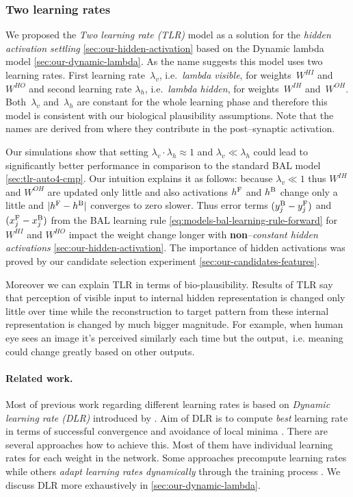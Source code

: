 
\subsubsection{Two learning rates} 
\label{sec:our-tlr}

We proposed the \emph{Two learning rate (TLR)} model as a solution for the \emph{hidden activation settling} \ref{sec:our-hidden-activation} based on the Dynamic lambda model \ref{sec:our-dynamic-lambda}. As the name suggests this model uses two learning rates. First learning rate~$\lambda_v$, i.e.~\emph{lambda visible}, for weights~$W^{HI}$ and~$W^{HO}$ and second learning rate $\lambda_h$, i.e.~\emph{lambda hidden}, for weights~$W^{IH}$ and~$W^{OH}$. Both~$\lambda_v$ and~$\lambda_h$ are constant for the whole learning phase and therefore this model is consistent with our biological plausibility assumptions. Note that the names are derived from where they contribute in the post--synaptic activation. 

Our simulations show that setting $\lambda_v \cdot \lambda_h \approx 1$ and $\lambda_v \ll \lambda_h$ could lead to significantly better performance in comparison to the standard BAL model \ref{sec:tlr-auto4-cmp}. Our intuition explains it as follows: because $\lambda_v \ll 1$ thus $W^{IH}$ and $W^{OH}$ are updated only little and also activations $h^{\rm F}$ and $h^{\rm B}$ change only a little and $|h^{\rm F}- h^{\rm B}|$ converges to zero slower. Thus error terms $(y_j^{\rm B} - y_j^{\rm F})$ and $(x_j^{\rm F} - x_j^{\rm B})$ from the BAL learning rule \ref{eq:models-bal-learning-rule-forward} for $W^{HI}$ and $W^{HO}$ impact the weight change longer with {\bf non}--\emph{constant hidden activations} \ref{sec:our-hidden-activation}. The importance of hidden activations was proved by our candidate selection experiment \ref{sec:our-candidates-features}. 

Moreover we can explain TLR in terms of bio-plausibility. Results of TLR say that perception of visible input to internal hidden representation is changed only little over time while the reconstruction to target pattern from these internal representation is changed by much bigger magnitude. For example, when human eye sees an image it's perceived similarly each time but the output,~i.e. meaning could change greatly based on other outputs. 

\paragraph{Related work.} 
\label{sec:our-tlr-related-work}
Most of previous work regarding different learning rates is based on \emph{Dynamic learning rate (DLR)} introduced by \citet{jacobs1988increased}. Aim of DLR is to compute \emph{best} learning rate in terms of successful convergence and avoidance of local minima \citep{behera2006adaptive}. There are several approaches how to achieve this. Most of them have individual learning rates for each weight in the network. Some approaches precompute learning rates \citep{weir1991method} while others \emph{adapt learning rates dynamically} through the training process \citep{yu1997efficient, magoulas1999improving, yu2002backpropagation}. We discuss DLR more exhaustively in \ref{sec:our-dynamic-lambda}. 

